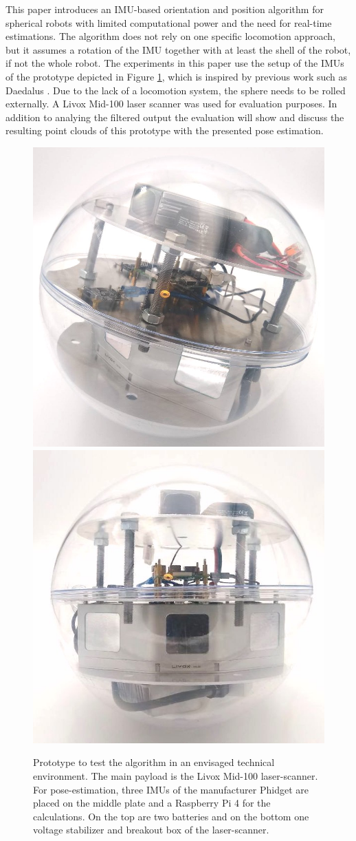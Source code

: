 \documentclass[letterpaper, 10 pt, conference]{ieeeconf}  %
\begin{document}
This paper introduces an IMU-based orientation and position algorithm for spherical robots with limited computational power and the need for real-time estimations.
The algorithm does not rely on one specific locomotion approach, but it assumes a rotation of the IMU together with at least the shell of the robot, if not the whole robot. 
The experiments in this paper use the setup of the IMUs of the prototype depicted in Figure \ref{fig:prototype}, which is inspired by previous work such as Daedalus \cite{rossi2021daedalus}.
Due to the lack of a locomotion system, the sphere needs to be rolled externally. 
A Livox Mid-100 laser scanner was used for evaluation purposes.
In addition to analying the filtered output the evaluation will show and discuss the resulting point clouds of this prototype with the presented pose estimation.
\begin{figure}[b]
\includegraphics[width=0.49\linewidth]{./graphics/photoReal1.jpeg}
\includegraphics[width=0.50\linewidth]{./graphics/photoReal3.jpeg}
\caption{Prototype to test the algorithm in an envisaged technical environment. The main payload is the Livox Mid-100 laser-scanner. For pose-estimation, three IMUs of the manufacturer Phidget are placed on the middle plate and a Raspberry Pi 4 for the calculations. On the top are two batteries and on the bottom one voltage stabilizer and breakout box of the laser-scanner. }
\label{fig:prototype}
\end{figure}
\end{document}
